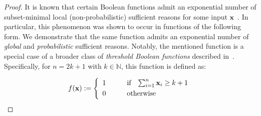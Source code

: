\documentclass{article}
\newcommand{\z}{\textbf{z}}
\newcommand{\x}{\textbf{x}}
\newcommand{\fml}[1]{{\mathcal{#1}}}
\newcommand{\mbf}[1]{\ensuremath\mathbf{#1}}
\begin{document}
\begin{proof}


It is known that certain Boolean functions admit an exponential number of subset-minimal local (non-probabilistic) sufficient reasons for some input $\x$~\cite{bassanlocal}. In particular, this phenomenon was shown to occur in functions of the following form. We demonstrate that the same function admits an exponential number of \emph{global} and \emph{probabilistic} sufficient reasons. Notably, the mentioned function is a special case of a broader class of \emph{threshold Boolean functions} described in~\cite{wegener2005complexity}. Specifically, for $n = 2k + 1$ with $k \in \mathbb{N}$, this function is defined as:


\begin{equation}
f(\x) :=
\left \{
\begin{array}{lcl}
1 & \quad & \textnormal{if \ \ $\sum_{i=1}^{n}\x_{i} \ge k+1$} \\[3pt]
0 & \quad & \textnormal{otherwise}
\end{array}
\right.
\end{equation}
%



\end{proof}
\end{document}
